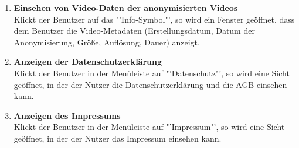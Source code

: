 \begin{enumerate}
\item \label{fa:anonymViddaten}\textbf{Einsehen von Video-Daten der anonymisierten Videos} \hfill \\
Klickt der Benutzer auf das "'Info-Symbol"', so wird ein Fenster geöffnet, dass dem Benutzer die Video-Metadaten (Erstellungsdatum, Datum der Anonymisierung, Größe, Auflösung, Dauer) anzeigt.

\item \textbf{Anzeigen der Datenschutzerklärung} \hfill \\
Klickt der Benutzer in der Menüleiste auf "'Datenschutz"', so wird eine Sicht geöffnet, in der der Nutzer die Datenschutzerklärung und die AGB einsehen kann.

\item \textbf{Anzeigen des Impressums} \hfill \\
Klickt der Benutzer in der Menüleiste auf "'Impressum"', so wird eine Sicht geöffnet, in der der Nutzer das Impressum einsehen kann.
\end{enumerate}